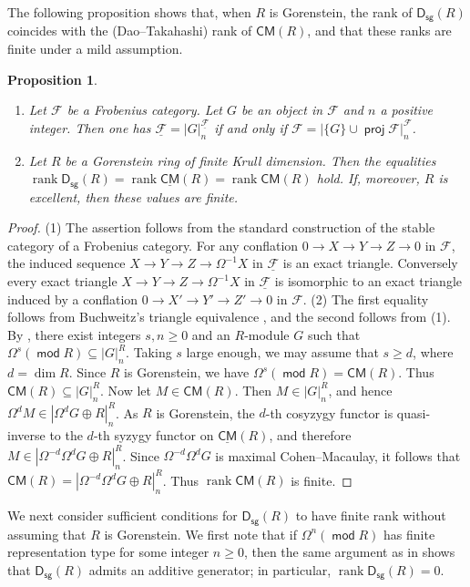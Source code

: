 \documentclass[10pt]{amsart}
\newtheorem{prop}[thm]{Proposition}
\theoremstyle{definition}
\theoremstyle{remark}
\numberwithin{equation}{thm}
\def\CM{\mathsf{CM}}
\def\dim{\operatorname{dim}}
\def\ds{\operatorname{\mathsf{D_{sg}}}}
\def\ge{\geqslant}
\def\mod{\operatorname{\mathsf{mod}}}
\def\proj{\operatorname{\mathsf{proj}}}
\def\rank{\operatorname{rank}}
\def\syz{\Omega}
\begin{document}
The following proposition shows that, when $R$ is Gorenstein, the rank of $\ds(R)$ coincides with the (Dao--Takahashi) rank of $\CM(R)$, and that these ranks are finite under a mild assumption.
\begin{prop}\label{frob}
\begin{enumerate}[\rm(1)]
\item
Let $\mathcal{F}$ be a Frobenius category. 
Let $G$ be an object in $\mathcal{F}$ and $n$ a positive integer.
Then one has $\underline{\mathcal{F}}={|G|}_{n}^{\underline{\mathcal{F}}}$ if and only if $\mathcal{F}={|\{G\}\cup\proj\mathcal{F}|}_{n}^{\mathcal{F}}$.
\item
Let $R$ be a Gorenstein ring of finite Krull dimension.
Then the equalities
$\rank\ds(R)=\rank\underline{\CM}(R)=\rank\CM(R)$
hold.
If, moreover, $R$ is excellent, then these values are finite.
\end{enumerate}
\end{prop}
\begin{proof}
(1) The assertion follows from the standard construction of the stable category of a Frobenius category. For any conflation $0\to X\to Y\to Z\to 0$ in $\mathcal{F}$, the induced sequence $X\to Y\to Z\to\Omega^{-1}X$ in $\underline{\mathcal{F}}$ is an exact triangle. Conversely every exact triangle $X\to Y\to Z\to\Omega^{-1}X$ in $\underline{\mathcal{F}}$ is isomorphic to an exact triangle induced by a conflation $0\to X'\to Y'\to Z'\to 0$ in $\mathcal{F}$.
(2) The first equality follows from Buchweitz's triangle equivalence \cite[Theorem 4.4.1]{B}, and the second follows from (1).
By \cite[Corollary 3.12]{DLT}, there exist integers $s,n \ge 0$ and an $R$-module $G$ such that $\Omega^{s}(\mod R) \subseteq {|G|}_{n}^{R}$.
Taking $s$ large enough, we may assume that $s \ge d$, where $d=\dim R$.
Since $R$ is Gorenstein, we have $\Omega^{s}(\mod R)=\CM(R)$.
Thus $\CM(R) \subseteq {|G|}_{n}^{R}$.
Now let $M \in \CM(R)$. 
Then $M \in {|G|}_{n}^{R}$, and hence $\Omega^{d}M \in {|\Omega^{d}G\oplus R|}_{n}^{R}$.
As $R$ is Gorenstein, the $d$-th cosyzygy functor is quasi-inverse to the $d$-th syzygy functor on $\underline{\CM}(R)$, and therefore $M \in {|\Omega^{-d}\Omega^{d}G\oplus R|}_{n}^{R}$.
Since $\Omega^{-d}\Omega^{d}G$ is maximal Cohen--Macaulay, it follows that $\CM(R)={|\Omega^{-d}\Omega^{d}G\oplus R|}_{n}^{R}$.
Thus $\rank \CM(R)$ is finite.
\end{proof}
We next consider sufficient conditions for $\ds(R)$ to have finite rank without assuming that $R$ is Gorenstein. 
We first note that if ${\syz}^{n}(\mod R)$ has finite representation type for some integer $n\ge0$, then the same argument as in \cite[Proposition 2.5]{Chen2011} shows that $\ds(R)$ admits an additive generator; in particular, $\rank\ds(R)=0$.
\end{document}
